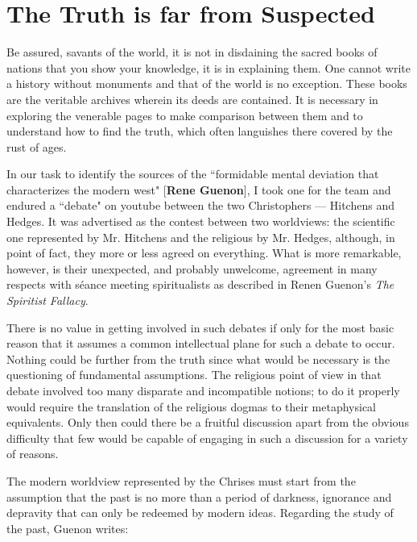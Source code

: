 \section{The Truth is far from Suspected}

\begin{quotex}
Be assured, savants of the world, it is not in disdaining the sacred books of nations that you show your knowledge, it is in explaining them. One cannot write a history without monuments and that of the world is no exception. These books are the veritable archives wherein its deeds are contained. It is necessary in exploring the venerable pages to make comparison between them and to understand how to find the truth, which often languishes there covered by the rust of ages. 

\end{quotex}
In our task to identify the sources of the ``formidable mental deviation that characterizes the modern west" [\textbf{Rene Guenon}], I took one for the team and endured a ``debate" on youtube between the two Christophers — Hitchens and Hedges. It was advertised as the contest between two worldviews: the scientific one represented by Mr. Hitchens and the religious by Mr. Hedges, although, in point of fact, they more or less agreed on everything. What is more remarkable, however, is their unexpected, and probably unwelcome, agreement in many respects with séance meeting spiritualists as described in Renen Guenon's \textit{The Spiritist Fallacy}.

There is no value in getting involved in such debates if only for the most basic reason that it assumes a common intellectual plane for such a debate to occur. Nothing could be further from the truth since what would be necessary is the questioning of fundamental assumptions. The religious point of view in that debate involved too many disparate and incompatible notions; to do it properly would require the translation of the religious dogmas to their metaphysical equivalents. Only then could there be a fruitful discussion apart from the obvious difficulty that few would be capable of engaging in such a discussion for a variety of reasons.

The modern worldview represented by the Chrises must start from the assumption that the past is no more than a period of darkness, ignorance and depravity that can only be redeemed by modern ideas. Regarding the study of the past, Guenon writes:

